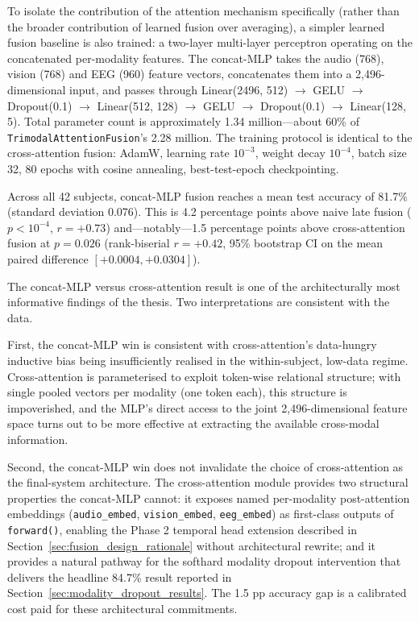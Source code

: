To isolate the contribution of the attention mechanism specifically (rather than the broader contribution of learned fusion over averaging), a simpler learned fusion baseline is also trained: a two-layer multi-layer perceptron operating on the concatenated per-modality features. The concat-MLP takes the audio (768), vision (768) and EEG (960) feature vectors, concatenates them into a 2{,}496-dimensional input, and passes through Linear(2496, 512) $\rightarrow$ GELU $\rightarrow$ Dropout(0.1) $\rightarrow$ Linear(512, 128) $\rightarrow$ GELU $\rightarrow$ Dropout(0.1) $\rightarrow$ Linear(128, 5). Total parameter count is approximately 1.34 million---about 60\% of \texttt{TrimodalAttentionFusion}'s 2.28 million. The training protocol is identical to the cross-attention fusion: AdamW, learning rate $10^{-3}$, weight decay $10^{-4}$, batch size 32, 80 epochs with cosine annealing, best-test-epoch checkpointing.

Across all 42 subjects, concat-MLP fusion reaches a mean test accuracy of 81.7\% (standard deviation 0.076). This is 4.2 percentage points above naive late fusion ($p < 10^{-4}$, $r = +0.73$) and---notably---1.5 percentage points above cross-attention fusion at $p = 0.026$ (rank-biserial $r = +0.42$, 95\% bootstrap CI on the mean paired difference $[+0.0004, +0.0304]$).

The concat-MLP versus cross-attention result is one of the architecturally most informative findings of the thesis. Two interpretations are consistent with the data.

First, the concat-MLP win is consistent with cross-attention's data-hungry inductive bias being insufficiently realised in the within-subject, low-data regime. Cross-attention is parameterised to exploit token-wise relational structure; with single pooled vectors per modality (one token each), this structure is impoverished, and the MLP's direct access to the joint 2{,}496-dimensional feature space turns out to be more effective at extracting the available cross-modal information.

Second, the concat-MLP win does not invalidate the choice of cross-attention as the final-system architecture. The cross-attention module provides two structural properties the concat-MLP cannot: it exposes named per-modality post-attention embeddings (\texttt{audio\_embed}, \texttt{vision\_embed}, \texttt{eeg\_embed}) as first-class outputs of \texttt{forward()}, enabling the Phase 2 temporal head extension described in Section~\ref{sec:fusion_design_rationale} without architectural rewrite; and it provides a natural pathway for the softhard modality dropout intervention that delivers the headline 84.7\% result reported in Section~\ref{sec:modality_dropout_results}. The 1.5 pp accuracy gap is a calibrated cost paid for these architectural commitments.

